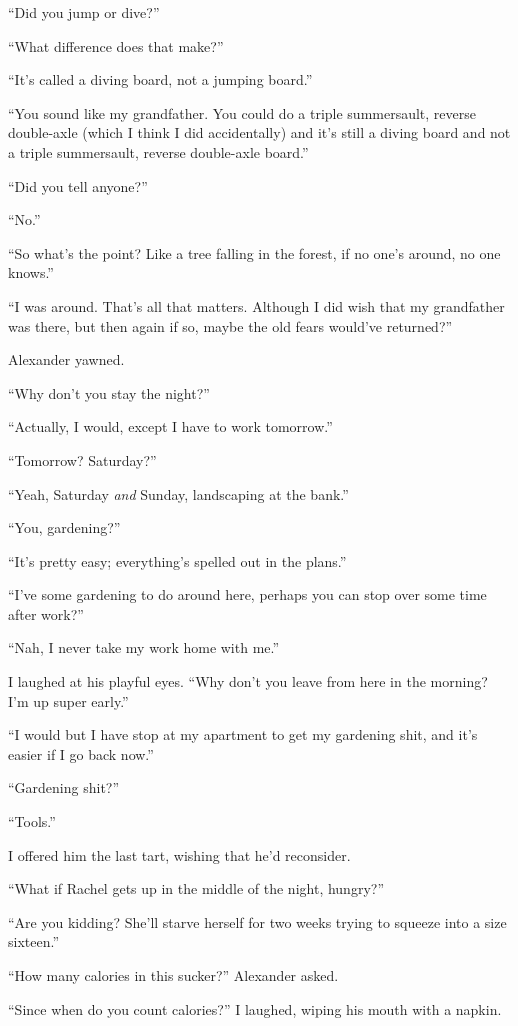 ``Did you jump or dive?''

``What difference does that make?''

``It's called a diving board, not a jumping board.''

``You sound like my grandfather. You could do a triple summersault,
reverse double-axle (which I think I did accidentally) and it's still a
diving board and not a triple summersault, reverse double-axle board.''

``Did you tell anyone?''

``No.''

``So what's the point? Like a tree falling in the forest, if no one's
around, no one knows.''

``I was around. That's all that matters. Although I did wish that my
grandfather was there, but then again if so, maybe the old fears
would've returned?''

Alexander yawned.

``Why don't you stay the night?''

``Actually, I would, except I have to work tomorrow.''

``Tomorrow? Saturday?''

``Yeah, Saturday \emph{and} Sunday, landscaping at the bank.''

``You, gardening?''

``It's pretty easy; everything's spelled out in the plans.''

``I've some gardening to do around here, perhaps you can stop over some
time after work?''

``Nah, I never take my work home with me.''

I laughed at his playful eyes. ``Why don't you leave from here in the
morning? I'm up super early.''

``I would but I have stop at my apartment to get my gardening shit, and
it's easier if I go back now.''

``Gardening shit?''

``Tools.''

I offered him the last tart, wishing that he'd reconsider.

``What if Rachel gets up in the middle of the night, hungry?''

``Are you kidding? She'll starve herself for two weeks trying to squeeze
into a size sixteen.''

``How many calories in this sucker?'' Alexander asked.

``Since when do you count calories?'' I laughed, wiping his mouth with a
napkin.

